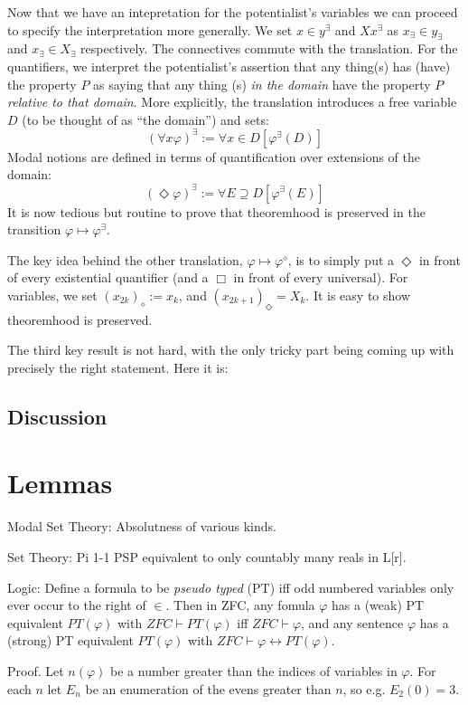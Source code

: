 \documentclass{article}
\begin{document}
Now that we have an intepretation for the potentialist's variables we can proceed to specify 
the interpretation more generally. We set $x \in y^\exists$ and $Xx^\exists$ as $x_\exists \in y_\exists$ 
and $x_\exists \in X_\exists$ respectively. The connectives commute with the translation. For the quantifiers,
we interpret the potentialist's assertion that any thing(s) has (have) the property $P$ as saying 
that any thing (s) \emph{in the domain} have the property $P$ \emph{relative to that domain}. More explicitly, 
the translation introduces a free variable $D$ (to be thought of as ``the domain'') and sets:
\[(\forall x \varphi)^\exists := \forall x \in D [\varphi^\exists(D)]\]
Modal notions are defined in terms of quantification over extensions of the domain:
\[ (\Diamond \varphi)^\exists := \forall E \supseteq D [\varphi^\exists(E)]\]
It is now tedious but routine to prove that theoremhood is preserved 
in the transition $\varphi \mapsto \varphi^\exists$.

The key idea behind the other translation, $\varphi \mapsto \varphi^\diamond$, 
is to simply put a $\Diamond$ in front of every existential quantifier (and a $\Box$ in front of 
every universal). For variables, we set $(x_{2k})_\diamond := x_k$, and $(x_{2k+1})_\Diamond = X_k$.
It is easy to show theoremhood is preserved.

The third key result is not hard, with the only tricky part being coming up with precisely 
the right statement. Here it is:


\subsection{Discussion}
\section{Lemmas}
Modal Set Theory:
Absolutness of various kinds.

Set Theory: 
Pi 1-1 PSP equivalent to only countably many reals in L[r].

Logic: 
Define a formula to be \emph{pseudo typed} (PT) iff 
odd numbered variables only ever occur
to the right of $\in$. 
Then in ZFC, any fomula $\varphi$ has a (weak) PT equivalent
$PT(\varphi)$ with $ZFC \vdash PT(\varphi)$ iff $ZFC \vdash \varphi$, 
and any sentence 
$\varphi$ has a (strong) PT equivalent $PT(\varphi)$ with 
$ZFC \vdash \varphi \leftrightarrow PT(\varphi)$.

Proof. Let $n(\varphi)$ be a number greater than the indices of variables in 
$\varphi$. For each $n$ let $E_n$ be an enumeration of 
the evens greater than $n$, so e.g. $E_2(0)=3$. 
\end{document}
